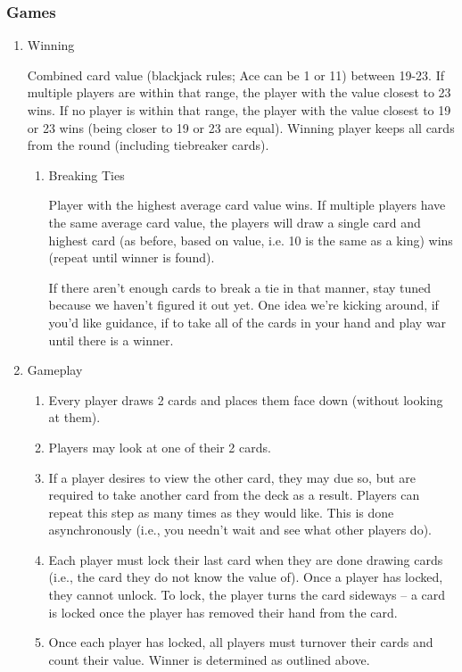 \documentclass[11pt]{article}
\begin{document}
\subsubsection{Games}
\label{sec-2-2-2}
\begin{enumerate}
\item Winning
\label{sec-2-2-2-1}

Combined card value (blackjack rules; Ace can be 1 or 11) between
19-23. If multiple players are within that range, the player with the
value closest to 23 wins. If no player is within that range, the
player with the value closest to 19 or 23 wins (being closer to 19 or
23 are equal). Winning player keeps all cards from the round
(including tiebreaker cards). 

\begin{enumerate}
\item Breaking Ties
\label{sec-2-2-2-1-1}

Player with the highest average card value wins. If multiple players
have the same average card value, the players will draw a single card
and highest card (as before, based on value, i.e. 10 is the same as a
king) wins (repeat until winner is found). 

If there aren't enough cards to break a tie in that manner, stay tuned
because we haven't figured it out yet. One idea we're kicking around,
if you'd like guidance, if to take all of the cards in your hand and
play war until there is a winner.
\end{enumerate}

\item Gameplay
\label{sec-2-2-2-2}

\begin{enumerate}
\item Every player draws 2 cards and places them face down (without
looking at them).
\item Players may look at one of their 2 cards.
\item If a player desires to view the other card, they may due so, but
are required to take another card from the deck as a result.
Players can repeat this step as many times as they would like. This
is done asynchronously (i.e., you needn't wait and see what other
players do).
\item Each player must lock their last card when they are done
drawing cards (i.e., the card they do not know the value of). Once
a player has locked, they cannot unlock. To lock, the player turns
the card sideways -- a card is locked once the player has removed
their hand from the card.
\item Once each player has locked, all players must turnover their cards
and count their value. Winner is determined as
outlined above.
\end{enumerate}
\end{enumerate}
\end{document}
